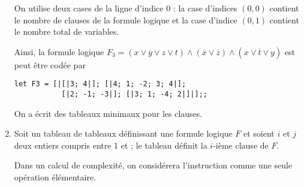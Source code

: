 \begin{enumerate}
On utilise deux cases de la ligne d’indice 0 : la case d’indices $(0, 0)$ contient le nombre de clauses de la formule logique et la case d’indice $(0, 1)$ contient le nombre total de variables. 

Ainsi, la formule logique $F_3 = (x \lor \overline y \lor z \lor t) \land (\overline x \lor \overline z) 
\land (x \lor \overline t \lor y)$ est peut être codée par 
\begin{lstlisting}
let F3 = [|[|3; 4|]; [|4; 1; -2; 3; 4|]; 
           [|2; -1; -3|]; [|3; 1; -4; 2|]|];;
\end{lstlisting}
On a écrit des tableaux minimaux pour les clauses.
\item Soit  un tableau de tableaux définissant une formule logique $F$ et soient $i$ et $j$ deux entiers
compris entre 1 et  ; le tableau  définit la $i$-ième clause de $F$.

Dans un calcul de complexité, on considérera l’instruction  comme une seule opération
élémentaire.
\end{enumerate}
\newpage
